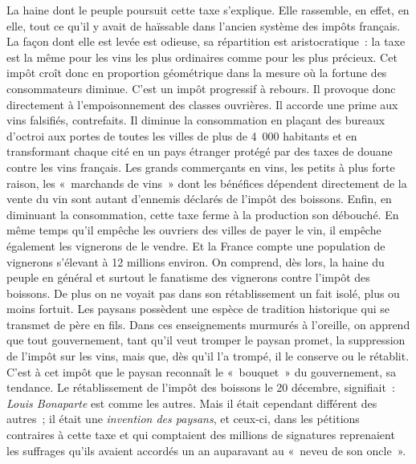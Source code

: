 \documentclass[french,twoside]{book} %
\begin{document}
La haine dont le peuple poursuit cette taxe s’explique. Elle rassemble, en effet, en elle, tout ce qu’il y avait de haïssable dans l’ancien système des impôts français. La façon dont elle est levée est odieuse, sa répartition est aristocratique : la taxe est la même pour les vins les plus ordinaires comme pour les plus précieux. Cet impôt croît donc en proportion géométrique dans la mesure où la fortune des consommateurs diminue. C’est un impôt progressif à rebours. Il provoque donc directement à l’empoisonnement des classes ouvrières. Il accorde une prime aux vins falsifiés, contrefaits. Il diminue la consommation en plaçant des bureaux d’octroi aux portes de toutes les villes de plus de 4 000 habitants et en transformant chaque cité en un pays étranger protégé par des taxes de douane contre les vins français. Les grands commerçants en vins, les petits à plus forte raison, les « marchands de vins » dont les bénéfices dépendent directement de la vente du vin sont autant d’ennemis déclarés de l’impôt des boissons. Enfin, en diminuant la consommation, cette taxe ferme à la production son débouché. En même temps qu’il empêche les ouvriers des villes de payer le vin, il empêche également les vignerons de le vendre. Et la France compte une population de vignerons s’élevant à 12 millions environ. On comprend, dès lors, la haine du peuple en général et surtout le fanatisme des vignerons contre l’impôt des boissons. De plus on ne voyait pas dans son rétablissement un fait isolé, plus ou moins fortuit. Les paysans possèdent une espèce de tradition historique qui se transmet de père en fils. Dans ces enseignements murmurés à l’oreille, on apprend que tout gouvernement, tant qu’il veut tromper le paysan promet, la suppression de l’impôt sur les vins, mais que, dès qu’il l’a trompé, il le conserve ou le rétablit. C’est à cet impôt que le paysan reconnaît le « bouquet » du gouvernement, sa tendance. Le rétablissement de l’impôt des boissons le 20 décembre, signifiait : \emph{Louis Bonaparte} est comme les autres. Mais il était cependant différent des autres ; il était une \emph{invention des paysans}, et ceux-ci, dans les pétitions contraires à cette taxe et qui comptaient des millions de signatures reprenaient les suffrages qu’ils avaient accordés un an auparavant au « neveu de son oncle ».\par
\end{document}
